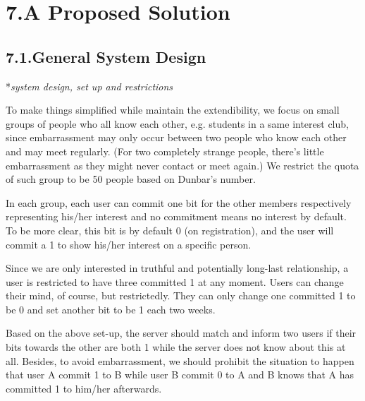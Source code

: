 \documentclass{article}
\begin{document}
\section{7.\hspace*{0.5em}A Proposed Solution}\label{sec-a-proposed-solution}%

\subsection{7.1.\hspace*{0.5em}General System Design}\label{sec-general-system-design}%

\noindent{}*\emph{system design, set up and restrictions}%

To make things simplified while maintain the extendibility, we focus on small groups of people who all know each other, e.g. students in a same interest club, since embarrassment may only occur between two people who know each other and may meet regularly. (For two completely strange people, there's little embarrassment as they might never contact or meet again.) We restrict the quota of such group to be 50 people based on Dunbar's number.%

In each group, each user can commit one bit for the other members respectively representing his/her interest and no commitment means no interest by default. To be more clear, this bit is by default 0 (on registration), and the user will commit a 1 to show his/her interest on a specific person.%

Since we are only interested in truthful and potentially long-last relationship, a user is restricted to have three committed 1 at any moment. Users can change their mind, of course, but restrictedly. They can only change one committed 1 to be 0 and set another bit to be 1 each two weeks.%

Based on the above set-up, the server should match and inform two users if their bits towards the other are both 1 while the server does not know about this at all. Besides, to avoid embarrassment, we should prohibit the situation to happen that user A commit 1 to B while user B commit 0 to A and B knows that A has committed 1 to him/her afterwards.%
\end{document}
